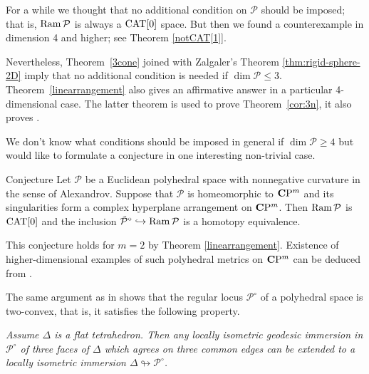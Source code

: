 \documentclass{compositio}
\begin{document}


For a while we thought that no additional condition on $\mathcal{P}$ should be imposed;
that is, $\mathop{\rm Ram}\nolimits \mathcal{P}$ is always a $\mathrm{CAT}[0]$ space.  
But then we found a counterexample in dimension 4 and higher;
see Theorem \ref{notCAT[1]}.

Nevertheless, Theorem~\ref{3cone} joined with Zalgaler's Theorem \ref{thm:rigid-sphere-2D}
imply that no additional condition is needed if $\dim \mathcal{P}\le 3$.
Theorem~\ref{linearrangement} also gives an affirmative answer in a particular 4-dimensional case.
The latter theorem is used to prove Theorem~\ref{cor:3n},
it also proves \cite[Conjecture 8.2]{panov}.

We don't know what conditions should be imposed in general if $\dim \mathcal{P}\ge 4$
but would like to formulate a conjecture in one interesting non-trivial case.

\begin{thm}{Conjecture} \label{planearrangement1} Let $\mathcal{P}$ be a Euclidean polyhedral space with nonnegative curvature in the sense of Alexandrov.
Suppose  that $\mathcal{P}$ is homeomorphic to $\mathbf{C}\mathrm{P}^m$ and its singularities form a complex hyperplane arrangement on $\mathbf{C}\mathrm{P}^m$. 
Then $\mathop{\rm Ram}\nolimits \mathcal{P}$ is  $\mathrm{CAT}[0]$ 
and the inclusion $\tilde{\mathcal{P}}^\circ\hookrightarrow\mathop{\rm Ram}\nolimits \mathcal{P}$ is a homotopy equivalence.
\end{thm}

This conjecture holds for $m=2$ by Theorem \ref{linearrangement}. 
Existence of higher-dimensional examples 
of such polyhedral metrics on $\mathbf{C}\mathrm{P}^m$ can be deduced from 
\cite{looijenga}.

The same argument as in \cite{panov-petrunin} shows that the regular locus $\mathcal{P}^\circ$ of a polyhedral space is two-convex,
that is, it satisfies the following property.

\emph{Assume $\Delta$ is a flat tetrahedron.
Then any locally isometric geodesic immersion in  $\mathcal{P}^\circ$
of three faces of $\Delta$ which agrees on three common edges  can be extended to a
locally isometric immersion $\Delta\looparrowright \mathcal{P}^\circ$.}
\end{document}
